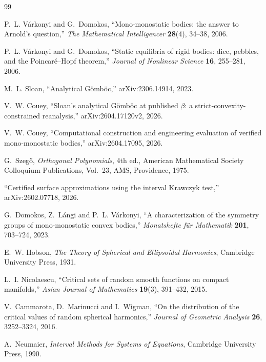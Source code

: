 \documentclass[11pt,a4paper]{article}
\theoremstyle{definition}
\begin{document}
\begin{thebibliography}{99}

 P.~L. V\'arkonyi and G.~Domokos, ``Mono-monostatic bodies: the answer to Arnold's
question,'' \textit{The Mathematical Intelligencer} \textbf{28}(4), 34--38, 2006.

 P.~L. V\'arkonyi and G.~Domokos, ``Static equilibria of rigid bodies: dice, pebbles,
and the Poincar\'e--Hopf theorem,'' \textit{Journal of Nonlinear Science} \textbf{16}, 255--281, 2006.

 M.~L. Sloan, ``Analytical G\"omb\"oc,'' arXiv:2306.14914, 2023.

 V.~W. Couey, ``Sloan's analytical G\"omb\"oc at published $\beta$: a
strict-convexity-constrained reanalysis,'' arXiv:2604.17120v2, 2026.

 V.~W. Couey, ``Computational construction and engineering evaluation of verified
mono-monostatic bodies,'' arXiv:2604.17095, 2026.

 G.~Szeg\H{o}, \textit{Orthogonal Polynomials}, 4th ed., American Mathematical Society
Colloquium Publications, Vol.~23, AMS, Providence, 1975.

 \relax``Certified surface approximations using the interval Krawczyk test,''
arXiv:2602.07718, 2026.

 G.~Domokos, Z.~L\'angi and P.~L. V\'arkonyi, ``A characterization of the symmetry
groups of mono-monostatic convex bodies,'' \textit{Monatshefte f\"ur Mathematik} \textbf{201}, 703--724, 2023.

 E.~W. Hobson, \textit{The Theory of Spherical and Ellipsoidal Harmonics}, Cambridge University
Press, 1931.

 L.~I. Nicolaescu, ``Critical sets of random smooth functions on compact manifolds,''
\textit{Asian Journal of Mathematics} \textbf{19}(3), 391--432, 2015.

 V.~Cammarota, D.~Marinucci and I.~Wigman, ``On the distribution of the critical values of
random spherical harmonics,'' \textit{Journal of Geometric Analysis} \textbf{26}, 3252--3324, 2016.

 A.~Neumaier, \textit{Interval Methods for Systems of Equations}, Cambridge University
Press, 1990.

\end{thebibliography}
\end{document}
